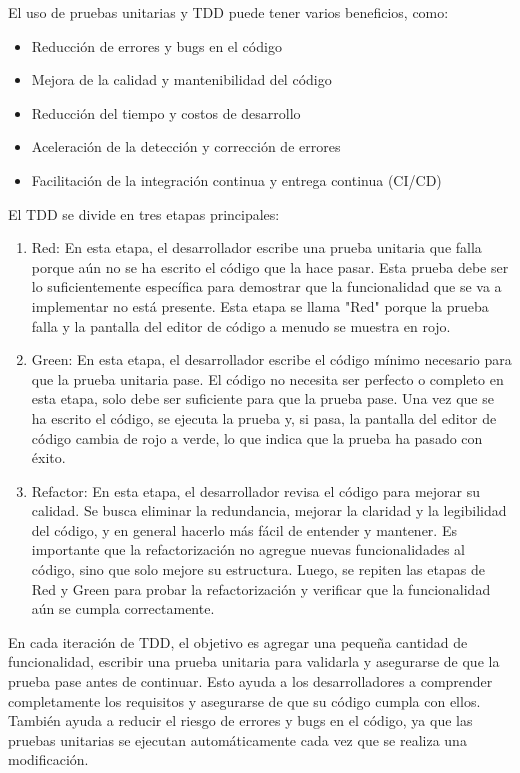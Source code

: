 \documentclass[executivepaper]{article}
\begin{document}
El uso de pruebas unitarias y TDD puede tener varios beneficios, como:

\begin{itemize}
\item Reducción de errores y bugs en el código
\item Mejora de la calidad y mantenibilidad del código
\item Reducción del tiempo y costos de desarrollo
\item Aceleración de la detección y corrección de errores
\item Facilitación de la integración continua y entrega continua (CI/CD)
\end{itemize}

El TDD se divide en tres etapas principales:

\begin{enumerate}
\item Red: En esta etapa, el desarrollador escribe una prueba unitaria que falla porque aún no se ha escrito el código que la hace pasar. Esta prueba debe ser lo suficientemente específica para demostrar que la funcionalidad que se va a implementar no está presente. Esta etapa se llama "Red" porque la prueba falla y la pantalla del editor de código a menudo se muestra en rojo.
\item Green: En esta etapa, el desarrollador escribe el código mínimo necesario para que la prueba unitaria pase. El código no necesita ser perfecto o completo en esta etapa, solo debe ser suficiente para que la prueba pase. Una vez que se ha escrito el código, se ejecuta la prueba y, si pasa, la pantalla del editor de código cambia de rojo a verde, lo que indica que la prueba ha pasado con éxito.
\item Refactor: En esta etapa, el desarrollador revisa el código para mejorar su calidad. Se busca eliminar la redundancia, mejorar la claridad y la legibilidad del código, y en general hacerlo más fácil de entender y mantener. Es importante que la refactorización no agregue nuevas funcionalidades al código, sino que solo mejore su estructura. Luego, se repiten las etapas de Red y Green para probar la refactorización y verificar que la funcionalidad aún se cumpla correctamente.
\end{enumerate}

En cada iteración de TDD, el objetivo es agregar una pequeña cantidad de funcionalidad, escribir una prueba unitaria para validarla y asegurarse de que la prueba pase antes de continuar. Esto ayuda a los desarrolladores a comprender completamente los requisitos y asegurarse de que su código cumpla con ellos. También ayuda a reducir el riesgo de errores y bugs en el código, ya que las pruebas unitarias se ejecutan automáticamente cada vez que se realiza una modificación.
\end{document}
